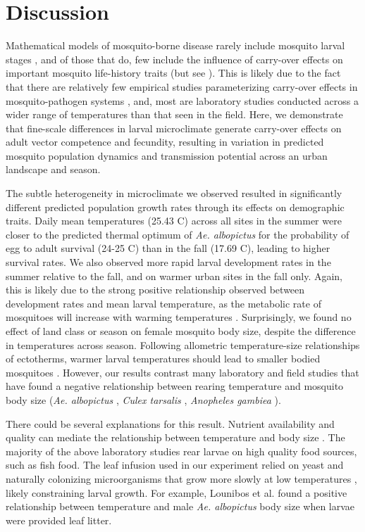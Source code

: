 \documentclass[12pt]{article}
\begin{document}
\section{Discussion}

Mathematical models of mosquito-borne disease rarely include mosquito larval stages \citep{reiner2013}, and of those that do, few include the influence of carry-over effects on important mosquito life-history traits (but see \citep{roux2015a}). This is likely due to the fact that there are relatively few empirical studies parameterizing  carry-over effects in mosquito-pathogen systems \citep{parham2015}, and, most  are laboratory studies conducted across a wider range of temperatures than that seen in the field. Here, we demonstrate that fine-scale differences in larval microclimate generate carry-over effects on adult vector competence and fecundity, resulting in variation in predicted mosquito population dynamics and transmission potential across an urban landscape and season.

The subtle heterogeneity in microclimate we observed resulted in significantly different predicted population growth rates through its effects on demographic traits. Daily mean temperatures (25.43 \degree C) across all sites in the summer were closer to the predicted thermal optimum of \textit{Ae. albopictus} for the probability of egg to adult survival (24-25 \degree C) \citep{mordecai2017} than in the fall (17.69 \degree C), leading to higher survival rates. We also observed more rapid larval development rates in the summer relative to the fall, and on warmer urban sites in the fall only. Again, this is likely due to the strong positive relationship observed between development rates and  mean larval temperature, as the metabolic rate of mosquitoes will increase with warming temperatures \citep{delatte2009}. Surprisingly, we found no effect of land class or season on female mosquito body size, despite the difference in temperatures across season. Following allometric temperature-size relationships of ectotherms, warmer larval temperatures should lead to smaller bodied mosquitoes \citep{angilleta2004}. However, our results contrast many laboratory and field studies that have found a negative relationship between rearing temperature and mosquito body size (\textit{Ae. albopictus} \citep{reiskind2012a, murdock2017}, \textit{Culex tarsalis} \citep{dodson2012}, \textit{Anopheles gambiea} \citep{koella1996}).

There could be several explanations for this result. Nutrient availability and quality can mediate the relationship between temperature and body size \citep{farjana2011}. The majority of the above laboratory studies rear larvae on high quality food sources, such as fish food. The leaf infusion used in our experiment relied on yeast and naturally colonizing microorganisms that grow more slowly at low temperatures \citep{ratkowsky1982}, likely constraining larval growth. For example, Lounibos et al. \citep{lounibos2002} found a positive relationship between temperature and male \textit{Ae. albopictus} body size when larvae were provided leaf litter.
\end{document}
